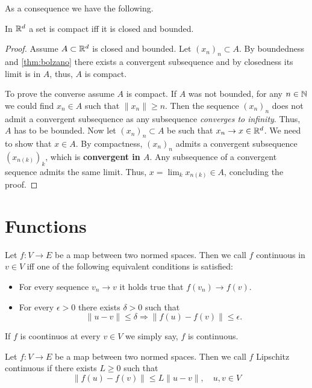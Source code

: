 As a consequence we have the following.

\begin{cor}
    In $\mathbb{R}^d$ a set is compact iff it is closed and bounded.
\end{cor}
\begin{proof}
    Assume $A\subset \mathbb{R}^d$ is closed and bounded. Let $(x_n)_n\subset A$. By boundedness and \cref{thm:bolzano} there exists a convergent subsequence and by closedness its limit is in $A$, thus, $A$ is compact. 

    To prove the converse assume $A$ is compact. If $A$ was not bounded, for any $n\in\mathbb{N}$ we could find $x_n\in A$ such that $\|x_n\|\geq n$. Then the sequence $(x_n)_n$ does not admit a convergent subsequence as any subsequence \emph{converges to infinity}. Thus, $A$ has to be bounded. Now let $(x_n)_n\subset A$ be such that $x_n\rightarrow x\in\mathbb{R}^d$. We need to show that $x\in A$. By compactness, $(x_n)_n$ admits a convergent subsequence $(x_{n(k)})_k$, which is \textbf{convergent in $A$}. Any subsequence of a convergent sequence admits the same limit. Thus, $x = \lim_k x_{n(k)}\in A$, concluding the proof.
\end{proof}

\section{Functions}

\begin{defn}[Continuity]
    Let $f:V\rightarrow E$ be a map between two normed spaces. Then we call $f$ continuous in $v\in V$ iff one of the following equivalent conditions is satisfied:
    \begin{itemize}
        \item For every sequence $v_n\rightarrow v$ it holds true that $f(v_n)\rightarrow f(v)$.
        \item For every $\epsilon>0$ there exists $\delta>0$ such that 
        \begin{equation}
            \|u-v\|\leq \delta\Rightarrow \|f(u)-f(v)\|\leq \epsilon.
        \end{equation}
    \end{itemize}
    If $f$ is coontinuos at every $v\in V$ we simply say, $f$ is continuous.
\end{defn}
\begin{defn}
    Let $f:V\rightarrow E$ be a map between two normed spaces. Then we call $f$ Lipschitz continuous if there exists $L\geq 0$ such that 
    \begin{equation}
        \|f(u)-f(v)\|\leq L\|u-v\|,\quad u,v\in V
    \end{equation}
\end{defn}

